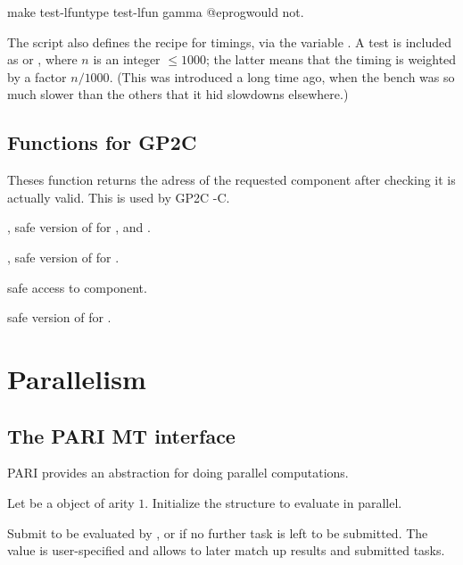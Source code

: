 \bprog
  make test-lfuntype test-lfun gamma
@eprog\noindent would not.

\item The  script also defines the recipe for
 timings, via the variable . A test is
included as  or , where $n$ is an integer $\leq 1000$;
the latter means that the timing is weighted by a factor $n/1000$. (This was
introduced a long time ago, when the  bench was so much slower
than the others that it hid slowdowns elsewhere.)

\section{Functions for GP2C}


Theses function returns the adress of the requested component after checking
it is actually valid. This is used by GP2C -C.

, safe version of  for ,
 and .

, safe version of  for .

 safe access to  component.

 safe version of
 for .

\chapter{Parallelism}

\section{The PARI MT interface}

PARI provides an abstraction for doing parallel computations.

 Let 
be a  object of arity $1$.  Initialize the structure 
to evaluate  in parallel.

 Submit
 to be evaluated by , or  if no further task
is left to be submitted. The value  is user-specified and allows
to later match up results and submitted tasks.

